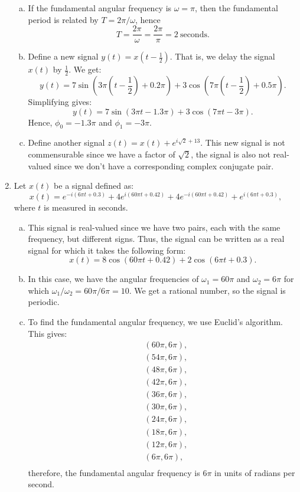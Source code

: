 \begin{enumerate}
\begin{enumerate}[a)]
\item If the fundamental angular frequency is $\omega=\pi$, then the fundamental period is related by $T=2\pi/\omega$, hence
$$T=\frac{2\pi}{\omega}=\frac{2\pi}{\pi}=2\ \text{seconds}.$$

\item Define a new signal $y(t)=x(t-\frac{1}{2})$. That is, we delay the signal $x(t)$ by $\frac{1}{2}$. We get:
$$y(t)=7\sin(3\pi \left(t-\frac{1}{2}\right)+0.2\pi)+3\cos(7\pi \left(t-\frac{1}{2}\right)+0.5\pi).$$
Simplifying gives:
$$y(t)=7\sin(3\pi t-1.3\pi)+3\cos(7\pi t-3\pi).$$
Hence, $\phi_{0}=-1.3\pi$ and $\phi_{1}=-3\pi$. 

\item Define another signal $z(t)=x(t)+e^{i\sqrt{2}+13}$. This new signal is not commensurable since we have a factor of $\sqrt{2}$, the signal is also not real-valued since we don't have a corresponding complex conjugate pair. 
\end{enumerate}

\item Let $x(t)$ be a signal defined as:
$$x(t)=e^{-i(6\pi t+0.3)}+4e^{i(60\pi t+0.42)}+4e^{-i(60\pi t+0.42)}+e^{i(6\pi t+0.3)},$$
where $t$ is measured in seconds. 
\begin{enumerate}[a)]
\item This signal is real-valued since we have two pairs, each with the same frequency, but different signs. Thus, the signal can be written as a real signal for which it takes the following form:
$$x(t)=8\cos(60\pi t+0.42)+2\cos(6\pi t+0.3).$$
\item In this case, we have the angular frequencies of $\omega_{1}=60\pi$ and $\omega_{2}=6\pi$ for which $\omega_{1}/\omega_{2}=60\pi/6\pi=10$. We get a rational number, so the signal is periodic. 
\item To find the fundamental angular frequency, we use Euclid's algorithm. This gives:
\begin{align*}
    &(60\pi,6\pi), \\
    &(54\pi,6\pi), \\
    &(48\pi,6\pi), \\
    &(42\pi,6\pi), \\
    &(36\pi,6\pi), \\
    &(30\pi,6\pi), \\
    &(24\pi,6\pi), \\
    &(18\pi,6\pi), \\
    &(12\pi,6\pi), \\
    &(6\pi,6\pi), \\
\end{align*}
therefore, the fundamental angular frequency is $6\pi$ in units of radians per second. 


\end{enumerate}
\end{enumerate}
